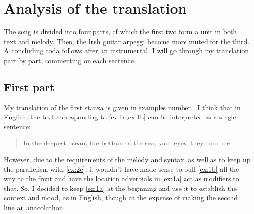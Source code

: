 \documentclass[12pt,paper=a4]{scrartcl}
\begin{document}
\begin{quote}


\end{quote}

\section{Analysis of the translation}

The song is divided into four parts, of which the first two form a unit in both
text and melody. Then, the lush guitar arpeggi become more muted for the third.
A concluding coda follows after an instrumental. I will go through my
translation part by part, commenting on each sentence.

\subsection{First part}

My translation of the first stanza is given in examples number
. I think that in English, the text corresponding to
\cref{ex:1a,ex:1b} can be interpreted as a single sentence: \blockquote{In the
deepest ocean, the bottom of the sea, your eyes, they turn me.} However, due
to the requirements of the melody and syntax, as well as to keep up the
parallelism with \cref{ex:2c}, it wouldn't have made sense to pull \cref{ex:1b}
all the way to the front and have the location adverbials in \cref{ex:1a} act
as modifiers to that. So, I decided to keep \cref{ex:1a} at the beginning and
use it to establish the context and mood, as in English, though at the expense
of making the second line an anacoluthon.
\end{document}
